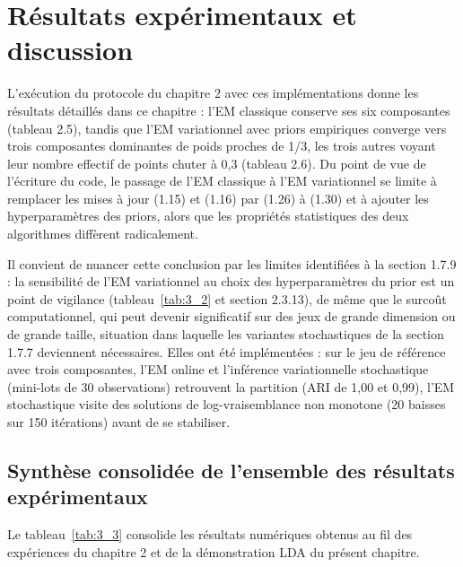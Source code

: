 \section{Résultats expérimentaux et discussion}
L'exécution du protocole du chapitre 2 avec ces implémentations donne les résultats détaillés dans ce chapitre : l'EM classique conserve ses six composantes (tableau 2.5), tandis que l'EM variationnel avec priors empiriques converge vers trois composantes dominantes de poids proches de 1/3, les trois autres voyant leur nombre effectif de points chuter à 0,3 (tableau 2.6). Du point de vue de l'écriture du code, le passage de l'EM classique à l'EM variationnel se limite à remplacer les mises à jour (1.15) et (1.16) par (1.26) à (1.30) et à ajouter les hyperparamètres des priors, alors que les propriétés statistiques des deux algorithmes diffèrent radicalement.

Il convient de nuancer cette conclusion par les limites identifiées à la section 1.7.9 : la sensibilité de l'EM variationnel au choix des hyperparamètres du prior est un point de vigilance (tableau~\ref{tab:3_2} et section 2.3.13), de même que le surcoût computationnel, qui peut devenir significatif sur des jeux de grande dimension ou de grande taille, situation dans laquelle les variantes stochastiques de la section 1.7.7 deviennent nécessaires. Elles ont été implémentées : sur le jeu de référence avec trois composantes, l'EM online et l'inférence variationnelle stochastique (mini-lots de 30 observations) retrouvent la partition (ARI de 1,00 et 0,99), l'EM stochastique visite des solutions de log-vraisemblance non monotone (20 baisses sur 150 itérations) avant de se stabiliser.

\subsection{Synthèse consolidée de l'ensemble des résultats expérimentaux}
Le tableau~\ref{tab:3_3} consolide les résultats numériques obtenus au fil des expériences du chapitre 2 et de la démonstration LDA du présent chapitre.


